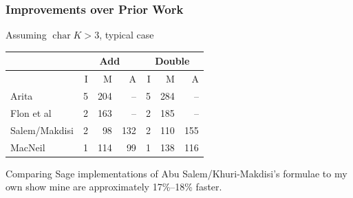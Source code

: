 \documentclass{beamer}
\newcommand{\pid}[1]{\left\langle #1 \right\rangle}
\newcommand{\bb}[1]{\mathbb{#1}}
\DeclareMathOperator{\Char}{char}
\renewcommand{\bar}{\overline}
\begin{document}

\begin{frame}
\frametitle{Improvements over Prior Work}
  Assuming $\Char K > 3$, typical case
  \begin{center}
    \begin{tabular}{l|rrr|rrr}
      & \multicolumn{3}{|c}{Add} & \multicolumn{3}{|c}{Double} \\
      \hline
      & I & M & A & I & M & A \\
      \hline
      Arita         & 5 & 204 &  -- & 5 & 284 & -- \\
      Flon et al    & 2 & 163 &  -- & 2 & 185 &  -- \\
      Salem/Makdisi & 2 &  98 & 132 & 2 & 110 & 155 \\
      MacNeil       & 1 & 114 &  99 & 1 & 138 & 116 
    \end{tabular}
  \end{center}
  Comparing Sage implementations of Abu Salem/Khuri-Makdisi's formulae to my own
  show mine are approximately 17\%--18\% faster.
\end{frame}
\end{document}
